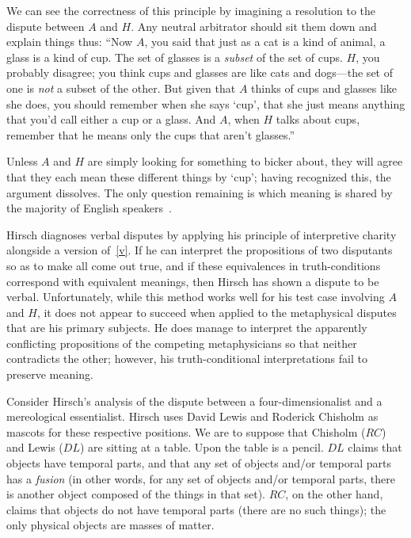 \documentclass[12pt,twoside]{reedfancy}
\begin{document}
\begin{spacing}{1.25}
We can see the correctness of this principle by imagining a resolution
to the dispute between $A$ and $H$.  Any neutral arbitrator should sit
them down and explain things thus: ``Now $A$, you said that just as a
cat is a kind of animal, a glass is a kind of cup.  The set of glasses
is a {\em subset} of the set of cups.  $H$, you probably disagree; you
think cups and glasses are like cats and dogs---the set of one is {\em
  not} a subset of the other.  But given that $A$ thinks of cups and
glasses like she does, you should remember when she says `cup', that
she just means anything that you'd call either a cup or a glass.  And
$A$, when $H$ talks about cups, remember that he means only the cups
that aren't glasses.''

Unless $A$ and $H$ are simply looking for something to bicker about,
they will agree that they each mean these different things by `cup';
having recognized this, the argument dissolves.  The only question
remaining is which meaning is shared by the majority of English
speakers~\citep[70]{hirsch2005}.

Hirsch diagnoses verbal disputes by applying his principle of
interpretive charity alongside a version of~\ref{v}.  If he can
interpret the propositions of two disputants so as to make all come
out true, and if these equivalences in truth-conditions correspond
with equivalent meanings, then Hirsch has shown a dispute to be
verbal.  Unfortunately, while this method works well for his test case
involving $A$ and $H$, it does not appear to succeed when applied to
the metaphysical disputes that are his primary subjects.  He does
manage to interpret the apparently conflicting propositions of the
competing metaphysicians so that neither contradicts the other;
however, his truth-conditional interpretations fail to preserve
meaning.

Consider Hirsch's analysis of the dispute between a
four-dimensionalist and a mereological essentialist.  Hirsch uses
David Lewis and Roderick Chisholm as mascots for these respective
positions.  We are to suppose that Chisholm ($RC$) and Lewis ($DL$)
are sitting at a table.  Upon the table is a pencil. $DL$ claims that
objects have temporal parts, and that any set of objects and/or
temporal parts has a {\em fusion} (in other words, for any set of
objects and/or temporal parts, there is another object composed of the
things in that set).  $RC$, on the other hand, claims that objects do
not have temporal parts (there are no such things); the only physical
objects are masses of matter.


\end{spacing}
\end{document}
